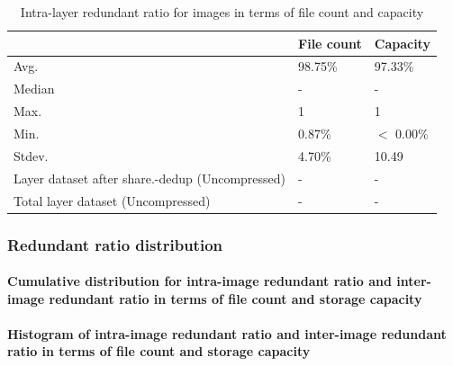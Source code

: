 \begin{table} 
	\centering 
	\scriptsize  
	\caption{Intra-layer redundant ratio for images in terms of file count and capacity} \label{tbl:inter_dup_ratio_images} 
	\begin{tabular}{|l|l|l|}%
		\hline 
		& File count & Capacity \\
		\hline
		Avg. & 98.75\% & 97.33\%\\
		\hline
		Median & - & - \\
		\hline
		Max. & 1 & 1\\
		\hline
		Min.  & 0.87\%  & $<$ 0.00\%\\
		\hline
		Stdev.  &  4.70\% & 10.49\\
		\hline
		Layer dataset after share.-dedup (Uncompressed) & -  & -\\
		\hline 
		Total layer dataset (Uncompressed) &  -	& -\\
		\hline
	\end{tabular} 
\end{table}

\subsubsection{Redundant ratio distribution}
\paragraph{Cumulative distribution for intra-image redundant ratio and inter-image redundant ratio in terms of file count and storage capacity}
\paragraph{Histogram of intra-image redundant ratio and inter-image redundant ratio in terms of file count and storage capacity}

